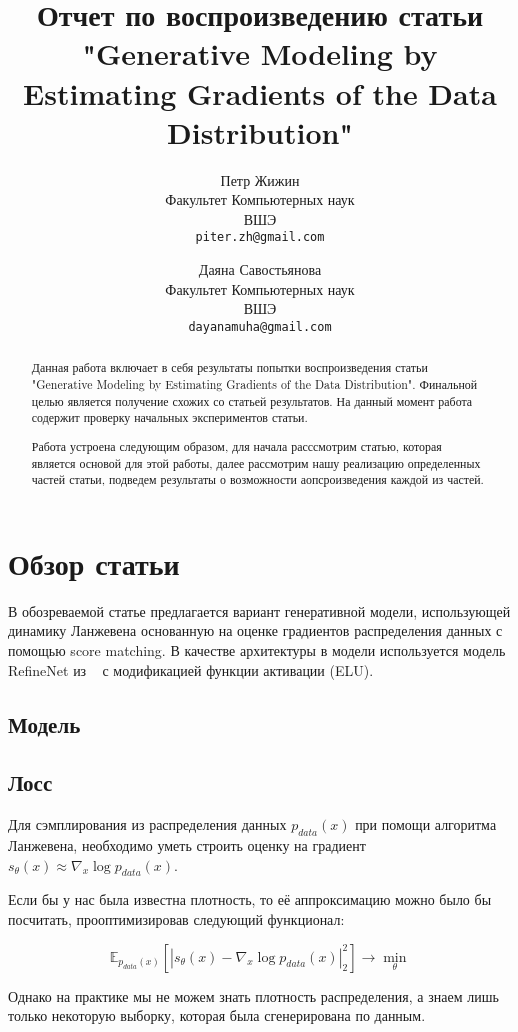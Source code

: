\documentclass{article}
\title{Отчет по воспроизведению статьи "Generative Modeling by Estimating Gradients of the Data Distribution"}
\author{%
  Петр Жижин \\
  Факультет Компьютерных наук\\
  ВШЭ\\
  \texttt{piter.zh@gmail.com} \\
   \and
   Даяна Савостьянова \\
   Факультет Компьютерных наук\\
   ВШЭ\\
   \texttt{dayanamuha@gmail.com} \\
}
\begin{document}

\maketitle

\begin{abstract}
  Данная работа включает в себя результаты попытки воспроизведения статьи 
  "Generative Modeling by Estimating Gradients of the Data Distribution". Финальной целью является получение схожих со статьей результатов. На данный момент работа содержит проверку начальных экспериментов статьи.
  
  Работа устроена следующим образом, для начала расссмотрим статью, которая является основой для этой работы, далее рассмотрим нашу реализацию определенных частей статьи, подведем результаты о возможности аопсроизведения каждой из частей.
\end{abstract}


\section{Обзор статьи}

В обозреваемой статье предлагается вариант генеративной модели, использующей динамику Ланжевена основанную на оценке градиентов распределения данных с помощью score matching. В качестве архитектуры в модели используется модель RefineNet из ~\cite{DBLP:journals/corr/LinMS016} с модификацией функции активации (ELU).

\subsection{Модель}

\subsection{Лосс}

Для сэмплирования из распределения данных $p_{data}(x)$ при помощи алгоритма
Ланжевена, необходимо уметь строить оценку на градиент
$s_{\theta}(x) \approx \nabla_x \log p_{data}(x)$.

Если бы у нас была известна плотность, то её аппроксимацию можно было бы
посчитать, прооптимизировав следующий функционал:

\[
\mathbb{E}_{p_{data}(x)} \left[ | s_{\theta}(x) - \nabla_x \log p_{data}(x) |_2^2 \right] \to \min_{\theta}
\]

Однако на практике мы не можем знать плотность распределения, а знаем лишь
только некоторую выборку, которая была сгенерирована по данным.
\end{document}
